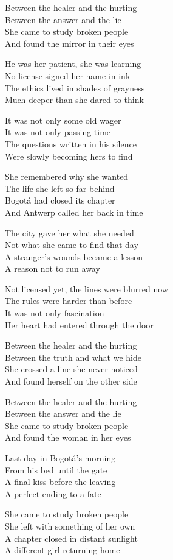 \begin{lyrics}
Between the healer and the hurting\\
Between the answer and the lie\\
She came to study broken people\\
And found the mirror in their eyes

He was her patient, she was learning\\
No license signed her name in ink\\
The ethics lived in shades of grayness\\
Much deeper than she dared to think

It was not only some old wager\\
It was not only passing time\\
The questions written in his silence\\
Were slowly becoming hers to find

She remembered why she wanted\\
The life she left so far behind\\
Bogotá had closed its chapter\\
And Antwerp called her back in time

The city gave her what she needed\\
Not what she came to find that day\\
A stranger’s wounds became a lesson\\
A reason not to run away

Not licensed yet, the lines were blurred now\\
The rules were harder than before\\
It was not only fascination\\
Her heart had entered through the door

Between the healer and the hurting\\
Between the truth and what we hide\\
She crossed a line she never noticed\\
And found herself on the other side

Between the healer and the hurting\\
Between the answer and the lie\\
She came to study broken people\\
And found the woman in her eyes

Last day in Bogotá’s morning\\
From his bed until the gate\\
A final kiss before the leaving\\
A perfect ending to a fate

She came to study broken people\\
She left with something of her own\\
A chapter closed in distant sunlight\\
A different girl returning home
\end{lyrics}

